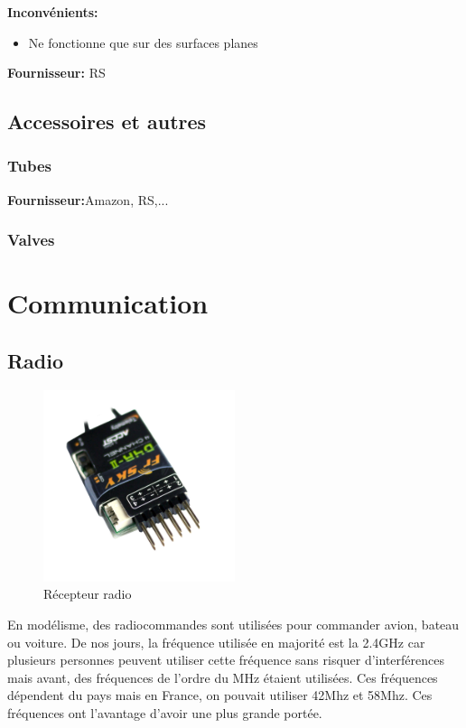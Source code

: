 \documentclass[a4paper, 11pt]{report}
\begin{document}
\textbf{Inconvénients:}
\begin{itemize}
\item Ne fonctionne que sur des surfaces planes
\end{itemize}

\textbf{Fournisseur:} RS

\section{Accessoires et autres}

\subsection{Tubes}

\textbf{Fournisseur:}Amazon, RS,...

\subsection{Valves}


\chapter{Communication}

\section{Radio}

\begin{figure}[h!]
\begin{centering}
\includegraphics[width=0.5\textwidth]{images/recepteurRadio.jpg}
\caption{Récepteur radio}
\par\end{centering}
\end{figure}

En modélisme, des radiocommandes sont utilisées pour commander avion, bateau ou voiture. De nos jours, la fréquence utilisée en majorité est la 2.4GHz car plusieurs personnes peuvent utiliser cette fréquence sans risquer d'interférences mais avant, des fréquences de l'ordre du MHz étaient utilisées. Ces fréquences dépendent du pays mais en France, on pouvait utiliser 42Mhz et 58Mhz. Ces fréquences ont l'avantage d'avoir une plus grande portée.
\end{document}
